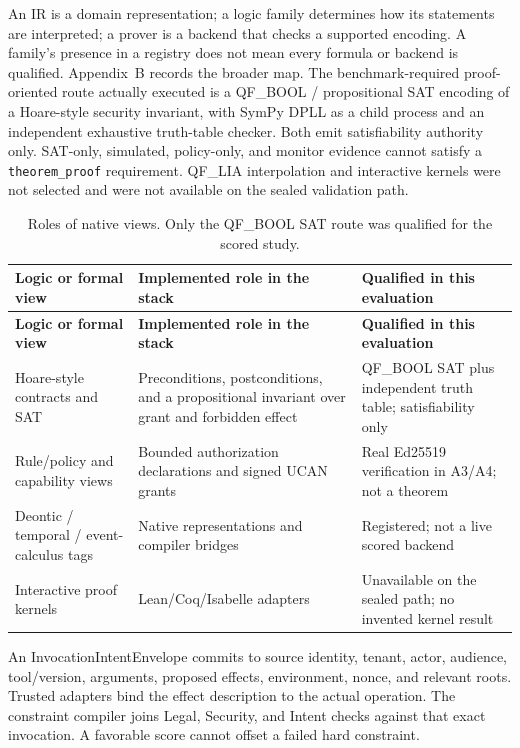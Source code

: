 \documentclass{article}
\begin{document}
An IR is a domain representation; a logic family determines how its statements are interpreted; a prover is a backend that checks a supported encoding. A family's presence in a registry does not mean every formula or backend is qualified. Appendix~B records the broader map. The benchmark-required proof-oriented route actually executed is a QF\_BOOL / propositional SAT encoding of a Hoare-style security invariant, with SymPy DPLL as a child process and an independent exhaustive truth-table checker. Both emit satisfiability authority only. SAT-only, simulated, policy-only, and monitor evidence cannot satisfy a \texttt{theorem\_proof} requirement. QF\_LIA interpolation and interactive kernels were not selected and were not available on the sealed validation path.
\begingroup
\renewcommand{\thetable}{2}
\begin{longtable}{@{}>{\raggedright\arraybackslash}p{.24\linewidth} >{\raggedright\arraybackslash}p{.32\linewidth} >{\raggedright\arraybackslash}p{.38\linewidth}@{}}
\caption{Roles of native views. Only the QF\_BOOL SAT route was qualified for the scored study.}\label{tab:2}\\
\toprule
\textbf{Logic or formal view} & \textbf{Implemented role in the stack} & \textbf{Qualified in this evaluation} \\
\midrule
\endfirsthead
\textbf{Logic or formal view} & \textbf{Implemented role in the stack} & \textbf{Qualified in this evaluation} \\
\midrule
\endhead
\bottomrule
\endlastfoot
Hoare-style contracts and SAT & Preconditions, postconditions, and a propositional invariant over grant and forbidden effect & QF\_BOOL SAT plus independent truth table; satisfiability only \\[3pt]
Rule/policy and capability views & Bounded authorization declarations and signed UCAN grants & Real Ed25519 verification in A3/A4; not a theorem \\[3pt]
Deontic / temporal / event-calculus tags & Native representations and compiler bridges & Registered; not a live scored backend \\[3pt]
Interactive proof kernels & Lean/Coq/Isabelle adapters & Unavailable on the sealed path; no invented kernel result \\[3pt]
\end{longtable}
\endgroup

An InvocationIntentEnvelope commits to source identity, tenant, actor, audience, tool/version, arguments, proposed effects, environment, nonce, and relevant roots. Trusted adapters bind the effect description to the actual operation. The constraint compiler joins Legal, Security, and Intent checks against that exact invocation. A favorable score cannot offset a failed hard constraint.
\end{document}
